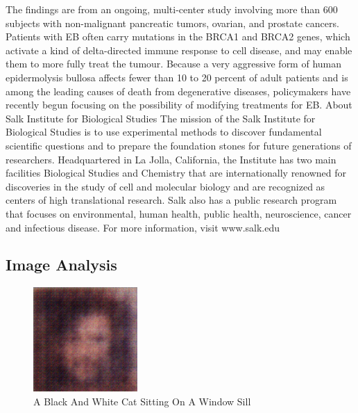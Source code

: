 \documentclass{article}%
\begin{document}
The findings are from an ongoing, multi{-}center study involving more than 600 subjects with non{-}malignant pancreatic tumors, ovarian, and prostate cancers. Patients with EB often carry mutations in the BRCA1 and BRCA2 genes, which activate a kind of delta{-}directed immune response to cell disease, and may enable them to more fully treat the tumour. Because a very aggressive form of human epidermolysis bullosa affects fewer than 10 to 20 percent of adult patients and is among the leading causes of death from degenerative diseases, policymakers have recently begun focusing on the possibility of modifying treatments for EB.\newline%
About Salk Institute for Biological Studies\newline%
The mission of the Salk Institute for Biological Studies is to use experimental methods to discover fundamental scientific questions and to prepare the foundation stones for future generations of researchers. Headquartered in La Jolla, California, the Institute has two main facilities  Biological Studies and Chemistry  that are internationally renowned for discoveries in the study of cell and molecular biology and are recognized as centers of high translational research. Salk also has a public research program that focuses on environmental, human health, public health, neuroscience, cancer and infectious disease. For more information, visit www.salk.edu

%
\subsection{Image Analysis}%
\label{subsec:ImageAnalysis}%


\begin{figure}[h!]%
\centering%
\includegraphics[width=150px]{500_fake_images/samples_5_224.png}%
\caption{A Black And White Cat Sitting On A Window Sill}%
\end{figure}

%
\end{document}
